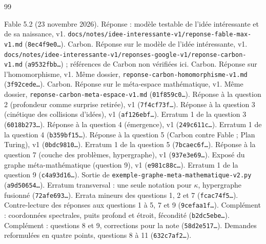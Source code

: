 \documentclass[11pt,a4paper]{article}
\theoremstyle{definition}
\theoremstyle{plain}
\newcommand{\chemin}[1]{\nolinkurl{#1}}
\begin{document}
\begin{thebibliography}{99}\small
\setlength{\itemsep}{1pt}

 Fable 5.2 (23 novembre 2026). Réponse : modèle testable de l'idée intéressante et
de sa naissance, v1. \chemin{docs/notes/idee-interessante-v1/reponse-fable-max-v1.md}
(\texttt{8ec4f9e0…}).
 Carbon. Réponse sur le modèle de l'idée intéressante, v1.
\chemin{docs/notes/idee-interessante-v1/reponses-google-v1/reponse-carbon-v1.md} (\texttt{a9532fbb…}) ;
références de Carbon non vérifiées ici.
 Carbon. Réponse sur l'homomorphisme, v1. Même dossier,
\chemin{reponse-carbon-homomorphisme-v1.md} (\texttt{3f92cede…}).
 Carbon. Réponse sur le méta-espace mathématique, v1. Même dossier,
\chemin{reponse-carbon-meta-espace-v1.md} (\texttt{01f859c0…}).
 Réponse à la question 2 (profondeur comme surprise retirée), v1 (\texttt{7f4cf73f…}).
 Réponse à la question 3 (cinétique des collisions d'idées), v1 (\texttt{af126ebf…}).
 Erratum 1 de la question 3 (\texttt{6018b273…}).
 Réponse à la question 4 (émergence), v1 (\texttt{249c611c…}).
 Erratum 1 de la question 4 (\texttt{b359bf15…}).
 Réponse à la question 5 (Carbon contre Fable ; Plan Turing), v1 (\texttt{0bdc9810…}).
 Erratum 1 de la question 5 (\texttt{7bcaec6f…}).
 Réponse à la question 7 (couche des problèmes, hypergraphe), v1 (\texttt{937e3e69…}).
 Exposé du graphe méta-mathématique (question 9), v1 (\texttt{e981c88c…}).
 Erratum 1 de la question 9 (\texttt{c4a93d16…}).
 Sortie de \chemin{exemple-graphe-meta-mathematique-v2.py} (\texttt{a9d50654…}).
 Erratum transversal : une seule notation pour $\kappa$, hypergraphe fusionné
(\texttt{72afe693…}).
 Errata mineurs des questions 1, 2 et 7 (\texttt{fcac74f5…}).
 Contre-lecture des réponses aux questions 1 à 5, 7 et 9 (\texttt{9cefaa1f…}).
 Complément : coordonnées spectrales, puits profond et étroit,
fécondité (\texttt{b2dc5ebe…}).
 Complément : questions 8 et 9, corrections pour la note (\texttt{58d2e517…}).
 Demandes reformulées en quatre points, questions 8 à 11 (\texttt{632c7af2…}).


\end{thebibliography}
\end{document}
